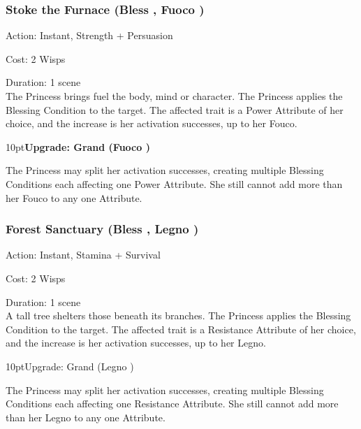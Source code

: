 \subsubsection*{Stoke the Furnace (Bless \textbullet\textbullet\textbullet\textbullet, Fuoco \textbullet\textbullet)}

\noindent Action: Instant, Strength + Persuasion

\noindent Cost: 2 Wisps

\noindent Duration: 1 scene \\

\noindent The Princess brings fuel the body, mind or character. The Princess applies the Blessing Condition to the target. The affected trait is a Power Attribute of her choice, and the increase is her activation successes, up to her Fouco. 

\begin{myindentpar}{10pt}\textbf{Upgrade: Grand (Fuoco \textbullet\textbullet\textbullet)}

The Princess may split her activation successes, creating multiple Blessing Conditions each affecting one Power Attribute. She still cannot add more than her Fouco to any one Attribute.\end{myindentpar}

\subsubsection*{Forest Sanctuary (Bless \textbullet\textbullet\textbullet\textbullet, Legno \textbullet\textbullet)}

\noindent Action: Instant, Stamina + Survival

\noindent Cost: 2 Wisps

\noindent Duration: 1 scene \\

\noindent A tall tree shelters those beneath its branches. The Princess applies the Blessing Condition to the target. The affected trait is a Resistance Attribute of her choice, and the increase is her activation successes, up to her Legno. 

\begin{myindentpar}{10pt}Upgrade: Grand (Legno \textbullet\textbullet\textbullet)

The Princess may split her activation successes, creating multiple Blessing Conditions each affecting one Resistance Attribute. She still cannot add more than her Legno to any one Attribute.\end{myindentpar}

